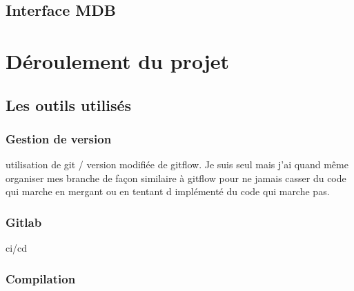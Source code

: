 \documentclass[a4paper]{article}
\begin{document}
\subsection{Interface MDB}



\section{Déroulement du projet}

\subsection{Les outils utilisés}

\subsubsection{Gestion de version}

utilisation de git / version modifiée de gitflow. Je suis seul mais j'ai quand
même organiser mes branche de façon similaire à gitflow pour ne jamais casser du
code qui marche en mergant ou en tentant d implémenté du code qui marche pas.

\subsubsection{Gitlab}

ci/cd

\subsubsection{Compilation}
\end{document}
